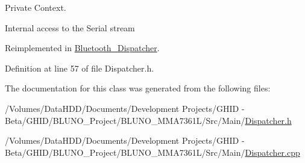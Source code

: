 \-Private \-Context. 

\-Internal access to the \-Serial stream 

\-Reimplemented in \hyperlink{class_bluetooth___dispatcher_a9b30fd1951f4e064a707ec75b941d18e}{\-Bluetooth\-\_\-\-Dispatcher}.



\-Definition at line 57 of file \-Dispatcher.\-h.



\-The documentation for this class was generated from the following files\-:\begin{DoxyCompactItemize}
\item 
/\-Volumes/\-Data\-H\-D\-D/\-Documents/\-Development Projects/\-G\-H\-I\-D -\/ Beta/\-G\-H\-I\-D/\-B\-L\-U\-N\-O\-\_\-\-Project/\-B\-L\-U\-N\-O\-\_\-\-M\-M\-A7361\-L/\-Src/\-Main/\hyperlink{_dispatcher_8h}{\-Dispatcher.\-h}\item 
/\-Volumes/\-Data\-H\-D\-D/\-Documents/\-Development Projects/\-G\-H\-I\-D -\/ Beta/\-G\-H\-I\-D/\-B\-L\-U\-N\-O\-\_\-\-Project/\-B\-L\-U\-N\-O\-\_\-\-M\-M\-A7361\-L/\-Src/\-Main/\hyperlink{_dispatcher_8cpp}{\-Dispatcher.\-cpp}\end{DoxyCompactItemize}
